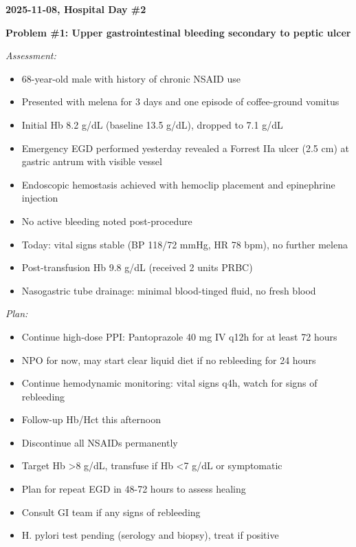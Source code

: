 \documentclass[12pt,a4paper]{article}
\begin{document}
\begin{mdframed}[linecolor=emergency_gray,linewidth=1pt]
\textbf{2025-11-08, Hospital Day \#2}

\textbf{Problem \#1: Upper gastrointestinal bleeding secondary to peptic ulcer}

\textit{Assessment:}
\begin{itemize}[nosep,leftmargin=15pt]
\item 68-year-old male with history of chronic NSAID use
\item Presented with melena for 3 days and one episode of coffee-ground vomitus
\item Initial Hb 8.2 g/dL (baseline 13.5 g/dL), dropped to 7.1 g/dL
\item Emergency EGD performed yesterday revealed a Forrest IIa ulcer (2.5 cm) at gastric antrum with visible vessel
\item Endoscopic hemostasis achieved with hemoclip placement and epinephrine injection
\item No active bleeding noted post-procedure
\item Today: vital signs stable (BP 118/72 mmHg, HR 78 bpm), no further melena
\item Post-transfusion Hb 9.8 g/dL (received 2 units PRBC)
\item Nasogastric tube drainage: minimal blood-tinged fluid, no fresh blood
\end{itemize}

\textit{Plan:}
\begin{itemize}[nosep,leftmargin=15pt]
\item Continue high-dose PPI: Pantoprazole 40 mg IV q12h for at least 72 hours
\item NPO for now, may start clear liquid diet if no rebleeding for 24 hours
\item Continue hemodynamic monitoring: vital signs q4h, watch for signs of rebleeding
\item Follow-up Hb/Hct this afternoon
\item Discontinue all NSAIDs permanently
\item Target Hb >8 g/dL, transfuse if Hb <7 g/dL or symptomatic
\item Plan for repeat EGD in 48-72 hours to assess healing
\item Consult GI team if any signs of rebleeding
\item H. pylori test pending (serology and biopsy), treat if positive
\end{itemize}


\end{mdframed}
\end{document}
